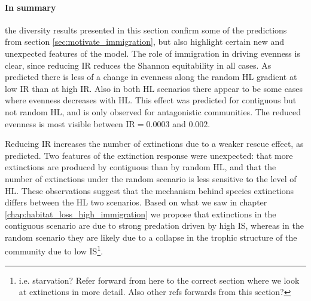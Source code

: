 
\paragraph*{In summary} the diversity results presented in this section confirm some of the predictions from section \ref{sec:motivate_immigration}, but also highlight certain new and unexpected features of the model. The role of immigration in driving evenness is clear, since reducing IR reduces the Shannon equitability in all cases. As predicted there is less of a change in evenness along the random HL gradient at low IR than at high IR. Also in both HL scenarios there appear to be some cases where evenness decreases with HL. This effect was predicted for contiguous but not random HL, and is only observed for antagonistic communities. The reduced evenness is most visible between IR$ =0.0003$ and $0.002$.

Reducing IR increases the number of extinctions due to a weaker rescue effect, as predicted. Two features of the extinction response were unexpected: that more extinctions are produced by contiguous than by random HL, and that the number of extinctions under the random scenario is less sensitive to the level of HL. These observations suggest that the mechanism behind species extinctions differs between the HL two scenarios. Based on what we saw in chapter \ref{chap:habitat_loss_high_immigration} we propose that extinctions in the contiguous scenario are due to strong predation driven by high IS, whereas in the random scenario they are likely due to a collapse in the trophic structure of the community due to low IS\footnote{i.e. starvation? Refer forward from here to the correct section where we look at extinctions in more detail. Also other refs forwards from this section?}.

